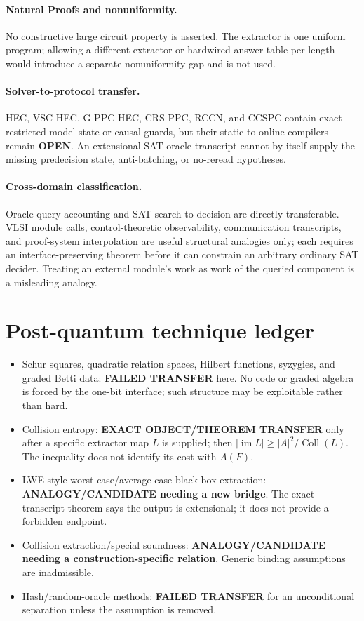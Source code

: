\documentclass[11pt]{article}
\newcommand{\OPEN}{\textbf{OPEN}}
\begin{document}
\paragraph{Natural Proofs and nonuniformity.}
No constructive large circuit property is asserted.  The extractor is one
uniform program; allowing a different extractor or hardwired answer table per
length would introduce a separate nonuniformity gap and is not used.

\paragraph{Solver-to-protocol transfer.}
HEC, VSC-HEC, G-PPC-HEC, CRS-PPC, RCCN, and CCSPC contain exact restricted-model
state or causal guards, but their static-to-online compilers remain \OPEN.
An extensional SAT oracle transcript cannot by itself supply the missing
predecision state, anti-batching, or no-reread hypotheses.

\paragraph{Cross-domain classification.}
Oracle-query accounting and SAT search-to-decision are directly transferable.
VLSI module calls, control-theoretic observability, communication transcripts,
and proof-system interpolation are useful structural analogies only; each
requires an interface-preserving theorem before it can constrain an arbitrary
ordinary SAT decider.  Treating an external module's work as work of the
queried component is a misleading analogy.

\section{Post-quantum technique ledger}
\begin{itemize}[leftmargin=*]
\item Schur squares, quadratic relation spaces, Hilbert functions, syzygies,
and graded Betti data: \textbf{FAILED TRANSFER} here.  No code or graded
algebra is forced by the one-bit interface; such structure may be exploitable
rather than hard.
\item Collision entropy: \textbf{EXACT OBJECT/THEOREM TRANSFER} only after a
specific extractor map $L$ is supplied; then
$|\operatorname{im}L|\ge |A|^2/\operatorname{Coll}(L)$.  The inequality does
not identify its cost with $A(F)$.
\item LWE-style worst-case/average-case black-box extraction:
\textbf{ANALOGY/CANDIDATE needing a new bridge}.  The exact transcript theorem
says the output is extensional; it does not provide a forbidden endpoint.
\item Collision extraction/special soundness:
\textbf{ANALOGY/CANDIDATE needing a construction-specific relation}.  Generic
binding assumptions are inadmissible.
\item Hash/random-oracle methods: \textbf{FAILED TRANSFER} for an
unconditional separation unless the assumption is removed.
\end{itemize}
\end{document}
